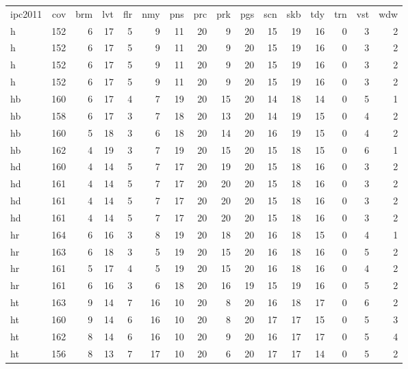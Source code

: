 \begin{center}
\begin{tabular}{lrrrrrrrrrrrrrrr}
ipc2011 & cov & brm & lvt & flr & nmy & pns & prc & prk & pgs & scn & skb & tdy & trn & vst & wdw\\
h & 152 & 6 & 17 & 5 & 9 & 11 & 20 & 9 & 20 & 15 & 19 & 16 & 0 & 3 & 2\\
h & 152 & 6 & 17 & 5 & 9 & 11 & 20 & 9 & 20 & 15 & 19 & 16 & 0 & 3 & 2\\
h & 152 & 6 & 17 & 5 & 9 & 11 & 20 & 9 & 20 & 15 & 19 & 16 & 0 & 3 & 2\\
h & 152 & 6 & 17 & 5 & 9 & 11 & 20 & 9 & 20 & 15 & 19 & 16 & 0 & 3 & 2\\
hb & 160 & 6 & 17 & 4 & 7 & 19 & 20 & 15 & 20 & 14 & 18 & 14 & 0 & 5 & 1\\
hb & 158 & 6 & 17 & 3 & 7 & 18 & 20 & 13 & 20 & 14 & 19 & 15 & 0 & 4 & 2\\
hb & 160 & 5 & 18 & 3 & 6 & 18 & 20 & 14 & 20 & 16 & 19 & 15 & 0 & 4 & 2\\
hb & 162 & 4 & 19 & 3 & 7 & 19 & 20 & 15 & 20 & 15 & 18 & 15 & 0 & 6 & 1\\
hd & 160 & 4 & 14 & 5 & 7 & 17 & 20 & 19 & 20 & 15 & 18 & 16 & 0 & 3 & 2\\
hd & 161 & 4 & 14 & 5 & 7 & 17 & 20 & 20 & 20 & 15 & 18 & 16 & 0 & 3 & 2\\
hd & 161 & 4 & 14 & 5 & 7 & 17 & 20 & 20 & 20 & 15 & 18 & 16 & 0 & 3 & 2\\
hd & 161 & 4 & 14 & 5 & 7 & 17 & 20 & 20 & 20 & 15 & 18 & 16 & 0 & 3 & 2\\
hr & 164 & 6 & 16 & 3 & 8 & 19 & 20 & 18 & 20 & 16 & 18 & 15 & 0 & 4 & 1\\
hr & 163 & 6 & 18 & 3 & 5 & 19 & 20 & 15 & 20 & 16 & 18 & 16 & 0 & 5 & 2\\
hr & 161 & 5 & 17 & 4 & 5 & 19 & 20 & 15 & 20 & 16 & 18 & 16 & 0 & 4 & 2\\
hr & 161 & 6 & 16 & 3 & 6 & 18 & 20 & 16 & 19 & 15 & 19 & 16 & 0 & 5 & 2\\
ht & 163 & 9 & 14 & 7 & 16 & 10 & 20 & 8 & 20 & 16 & 18 & 17 & 0 & 6 & 2\\
ht & 160 & 9 & 14 & 6 & 16 & 10 & 20 & 8 & 20 & 17 & 17 & 15 & 0 & 5 & 3\\
ht & 162 & 8 & 14 & 6 & 16 & 10 & 20 & 9 & 20 & 16 & 17 & 17 & 0 & 5 & 4\\
ht & 156 & 8 & 13 & 7 & 17 & 10 & 20 & 6 & 20 & 17 & 17 & 14 & 0 & 5 & 2\\
\end{tabular}
\end{center}

